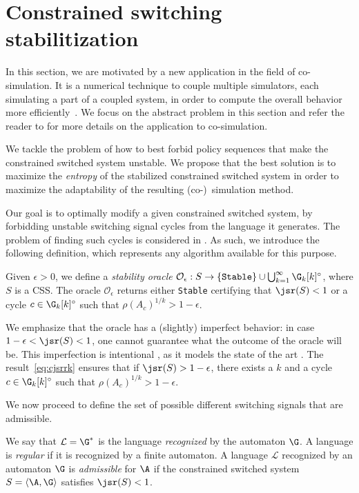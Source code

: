 \documentclass[11pt,twoside,a4paper,openright]{uclouvain-thesis}
\newcommand{\Paths}{\G_k}
\newcommand{\tuple}[1]{\ensuremath{ \left\langle #1 \right\rangle }}
\newcommand{\Lang}{\mathcal{L}}
\newcommand{\LangAutom}[1][\G]{{#1}^*}
\newcommand{\Oracle}{\mathcal{O}}
\newcommand{\Cycles}[1][k]{\Paths[#1]^\circ}
\begin{document}
\section{Constrained switching stabilitization}
\label{sec:switchstab}

In this section, we are motivated by a new application \cite{Gomes2017d} in the field of co-simulation.
It is a numerical technique to couple multiple simulators, each simulating a part of a coupled system, in order to compute the overall behavior more efficiently~\cite{gomes2018co}.
We focus on the abstract problem in this section and refer the reader
to \cite{gomes2018minimally} for more details on the application to co-simulation.

We tackle the problem of how to best forbid policy sequences that make the constrained switched system unstable.
We propose that the best solution is to maximize the \emph{entropy} of the stabilized constrained switched system in order to maximize the adaptability of the resulting (co-)~simulation method.

Our goal is to optimally modify a given constrained switched system, by forbidding unstable switching signal cycles from the language it generates.
The problem of finding such cycles is considered in .
As such, we introduce the following definition, which represents any algorithm available for this purpose.
\begin{mydef}[Oracle]\label{def:oracle}
  Given $\epsilon > 0$, we define a \emph{stability oracle} $\Oracle_\epsilon: S \to \{\texttt{Stable}\} \cup \bigcup_{k=1}^\infty \Cycles$, where $S$ is a CSS.
  The oracle $\Oracle_\epsilon$ returns either \texttt{Stable} certifying that $\jsr(S) < 1$ or a cycle $c \in \Cycles$ such that $\rho(A_c)^{1/k} > 1 - \epsilon$.
\end{mydef}

We emphasize that the oracle has a (slightly) imperfect behavior: in case $1-\epsilon < \jsr(S) < 1$,
one cannot guarantee what the outcome of the oracle will be.
This imperfection is intentional%
, as it models the state of the art \cite{parrilo2008approximation}.
The result~\eqref{eq:cjsrrk} ensures that if $\jsr(S) > 1 - \epsilon$, there exists a $k$ and a cycle $c \in \Cycles$ such that $\rho(A_c)^{1/k} > 1 - \epsilon$.

We now proceed to define the set of possible different switching signals that are admissible.

\begin{mydef}
  \label{def:reg}
  We say that $\Lang=\LangAutom$ is the language \emph{recognized} by the automaton $\G$.
  A language is \emph{regular} if it is recognized by a finite automaton.
  A language $\Lang$ recognized by an automaton $\G$ is \emph{admissible} for $\A$ if the constrained switched system $S = \tuple{\A, \G}$ satisfies
  $\jsr(S) < 1$.
\end{mydef}
\end{document}
